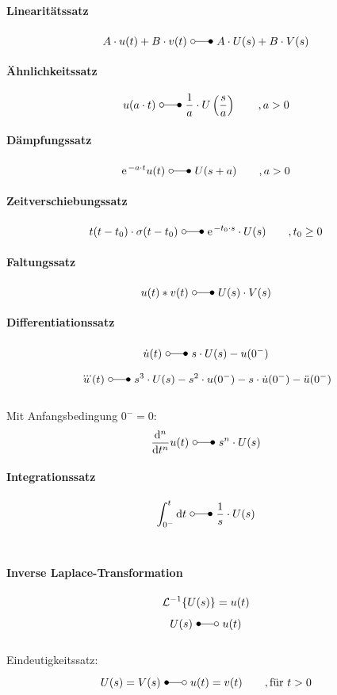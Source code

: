 \paragraph{Linearitätssatz}
\[
	A \cdot u(t) + B \cdot v(t) \ \laplace\ A \cdot U(s) + B \cdot V(s) 
\]

\paragraph{Ähnlichkeitssatz}
\[
	u(a \cdot t)\ \laplace \ \frac{1}{a} \cdot U\left(\frac{s}{a}\right) \qquad ,a>0
\]

\paragraph{Dämpfungssatz}
\[
	\e^{-a\cdot t}u(t) \ \laplace \ U(s + a) \qquad ,a>0	
\]

\paragraph{Zeitverschiebungssatz}
\[
	t(t-t_0) \cdot \sigma (t-t_0) \ \laplace \ \e^{-t_0 \cdot s} \cdot U(s)	\qquad ,t_0 \geq 0
\]

\paragraph{Faltungssatz}
\[
	u(t) \ast v(t) \ \laplace \ U(s) \cdot V(s)
\]

\paragraph{Differentiationssatz}
\[
	\dot{u}(t) \ \laplace \ s \cdot U(s) - u(0^-)
\]

\[
	\dddot{u}(t) \ \laplace \ s^3 \cdot U(s) - s^2 \cdot u(0^-) - s \cdot \dot{u}(0^-) - \ddot{u}(0^-)
\]
\\
Mit Anfangsbedingung $0^- = 0$:
\[
	\difrac{^n}{t^n}u(t) \ \laplace \ s^n \cdot U(s)
\]

\paragraph{Integrationssatz}
\[
	\int_{0^-}^{t} \di t \ \laplace \ \frac{1}{s}\cdot U(s)
\]
\\

\paragraph{Inverse Laplace-Transformation}
\[
	\mathcal{L}^{-1}\{U(s)\} = u(t)
\]
\[
	U(s) \ \Laplace \ u(t)
\]
\\Eindeutigkeitssatz:
\[
	U(s) = V(s) \ \Laplace \ u(t) = v(t) \qquad , \text{für }t>0
\]
\\\\

